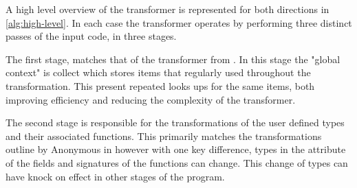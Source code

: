 \documentclass[ oneside,%
                    author={James Elgar},
                    degree={MEng},
                     title={Bidirectional transformer between functional and \\ object-oriented programming in Rust},
                  subtitle={}]{dissertation}
\newcommand{\weixin}{Anonymous }
\begin{document}




A high level overview of the transformer is represented for both directions in \autoref{alg:high-level}. In each case the transformer operates by performing three distinct passes of the input code, in three stages.

The first stage, matches that of the transformer from \cite{food}. In this stage the "global context" is collect which stores items that regularly used throughout the transformation. This present repeated looks ups for the same items, both improving efficiency and reducing the complexity of the transformer.

The second stage is responsible for the transformations of the user defined types and their associated functions. This primarily matches the transformations outline by \weixin in \cite{food} however with one key difference, types in the attribute of the fields and signatures of the functions can change. This change of types can have knock on effect in other stages of the program. 
\end{document}
